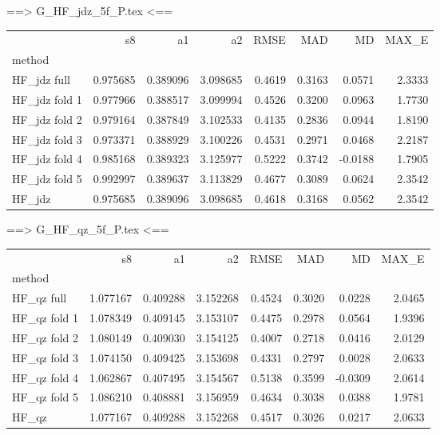 ==> G_HF_jdz_5f_P.tex <==
\begin{tabular}{lrrrrrrr}
 & s8 & a1 & a2 & RMSE & MAD & MD & MAX_E \\
method &  &  &  &  &  &  &  \\
HF_jdz full & 0.975685 & 0.389096 & 3.098685 & 0.4619 & 0.3163 & 0.0571 & 2.3333 \\
HF_jdz fold 1 & 0.977966 & 0.388517 & 3.099994 & 0.4526 & 0.3200 & 0.0963 & 1.7730 \\
HF_jdz fold 2 & 0.979164 & 0.387849 & 3.102533 & 0.4135 & 0.2836 & 0.0944 & 1.8190 \\
HF_jdz fold 3 & 0.973371 & 0.388929 & 3.100226 & 0.4531 & 0.2971 & 0.0468 & 2.2187 \\
HF_jdz fold 4 & 0.985168 & 0.389323 & 3.125977 & 0.5222 & 0.3742 & -0.0188 & 1.7905 \\
HF_jdz fold 5 & 0.992997 & 0.389637 & 3.113829 & 0.4677 & 0.3089 & 0.0624 & 2.3542 \\
HF_jdz & 0.975685 & 0.389096 & 3.098685 & 0.4618 & 0.3168 & 0.0562 & 2.3542 \\
\end{tabular}

==> G_HF_qz_5f_P.tex <==
\begin{tabular}{lrrrrrrr}
 & s8 & a1 & a2 & RMSE & MAD & MD & MAX_E \\
method &  &  &  &  &  &  &  \\
HF_qz full & 1.077167 & 0.409288 & 3.152268 & 0.4524 & 0.3020 & 0.0228 & 2.0465 \\
HF_qz fold 1 & 1.078349 & 0.409145 & 3.153107 & 0.4475 & 0.2978 & 0.0564 & 1.9396 \\
HF_qz fold 2 & 1.080149 & 0.409030 & 3.154125 & 0.4007 & 0.2718 & 0.0416 & 2.0129 \\
HF_qz fold 3 & 1.074150 & 0.409425 & 3.153698 & 0.4331 & 0.2797 & 0.0028 & 2.0633 \\
HF_qz fold 4 & 1.062867 & 0.407495 & 3.154567 & 0.5138 & 0.3599 & -0.0309 & 2.0614 \\
HF_qz fold 5 & 1.086210 & 0.408881 & 3.156959 & 0.4634 & 0.3038 & 0.0388 & 1.9781 \\
HF_qz & 1.077167 & 0.409288 & 3.152268 & 0.4517 & 0.3026 & 0.0217 & 2.0633 \\
\end{tabular}


